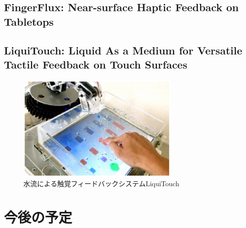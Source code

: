 \documentclass[11pt,a4paper]{jarticle}
\begin{document}
\subsection{FingerFlux: Near-surface Haptic Feedback on Tabletops\cite{Weiss:2011}}

\subsection{LiquiTouch: Liquid As a Medium for Versatile Tactile Feedback on Touch Surfaces\cite{Richter:2013}}

\begin{figure}[H]
  \begin{center}
  \includegraphics[width=8cm]{figure6.eps}
  \caption{水流による触覚フィードバックシステムLiquiTouch}
  \end{center}
\end{figure}

\section{今後の予定}



\end{document}

